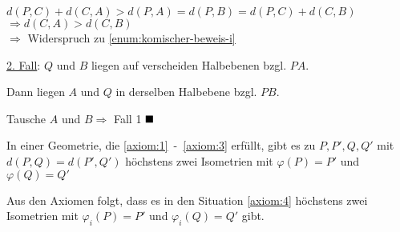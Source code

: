 \begin{beweis}
\begin{enumerate}[label=(\roman*)]
\begin{enumerate}[label=\alph*)]
                      $d(P,C) + d(C,A) > d(P,A) = d(P,B) = d(P,C) + d(C, B)$\\
                      $\Rightarrow d(C, A) > d(C, B)$\\
                      $\Rightarrow$ Widerspruch zu \ref{enum:komischer-beweis-i}
            \end{enumerate}
    \end{enumerate}

    \underline{2. Fall}: $Q$ und $B$ liegen auf verscheiden Halbebenen bzgl. $PA$.

    Dann liegen $A$ und $Q$ in derselben Halbebene bzgl. $PB$.

    Tausche $A$ und $B \Rightarrow$  Fall 1 $\qed$
\end{beweis}

\begin{proposition}%
    In einer Geometrie, die \ref{axiom:1}~-~\ref{axiom:3} erfüllt,
    gibt es zu $P, P', Q, Q'$ mit $d(P, Q) = d(P', Q')$ höchstens
    zwei Isometrien mit $\varphi(P) = P'$ und $\varphi(Q) = Q'$

    Aus den Axiomen  folgt, dass es in 
    den Situation \ref{axiom:4} höchstens zwei Isometrien mit
    $\varphi_i(P) = P'$ und $\varphi_i(Q) = Q'$ gibt.
\end{proposition}

